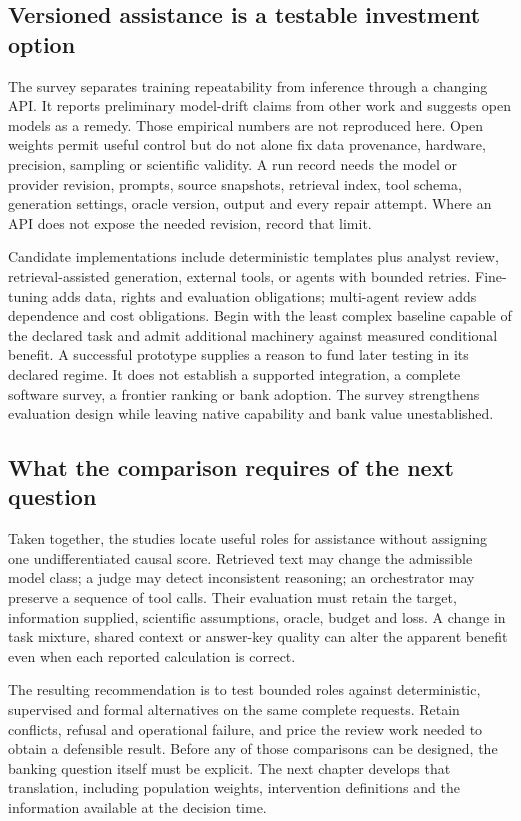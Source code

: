 \subsection{Versioned assistance is a testable investment option}

The survey separates training repeatability from inference through a changing
API. It reports preliminary model-drift claims from other work and suggests
open models as a remedy. Those empirical numbers are not reproduced here.
Open weights permit useful control but do not alone fix data provenance,
hardware, precision, sampling or scientific validity. A run record needs the
model or provider revision, prompts, source snapshots, retrieval index, tool
schema, generation settings, oracle version, output and every repair attempt.
Where an API does not expose the needed revision, record that limit.
\citep{exec24_llmchallenges_original}

Candidate implementations include deterministic templates plus analyst review,
retrieval-assisted generation, external tools, or agents with bounded retries.
Fine-tuning adds data, rights and evaluation obligations; multi-agent review adds
dependence and cost obligations. Begin with the least complex baseline capable
of the declared task and admit additional machinery against measured conditional
benefit. A successful prototype supplies a reason to fund later testing in its
declared regime. It does not establish a supported integration, a complete
software survey, a frontier ranking or bank adoption. The survey strengthens
evaluation design while leaving native capability and bank value unestablished.

\subsection{What the comparison requires of the next question}

Taken together, the studies locate useful roles for assistance without assigning
one undifferentiated causal score. Retrieved text may change the admissible
model class; a judge may detect inconsistent reasoning; an orchestrator may
preserve a sequence of tool calls. Their evaluation must retain the target,
information supplied, scientific assumptions, oracle, budget and loss. A change
in task mixture, shared context or answer-key quality can alter the apparent
benefit even when each reported calculation is correct.

The resulting recommendation is to test bounded roles against deterministic,
supervised and formal alternatives on the same complete requests. Retain
conflicts, refusal and operational failure, and price the review work needed
to obtain a defensible result. Before any of those comparisons can be designed,
the banking question itself must be explicit. The next chapter develops that
translation, including population weights, intervention definitions and the
information available at the decision time.

